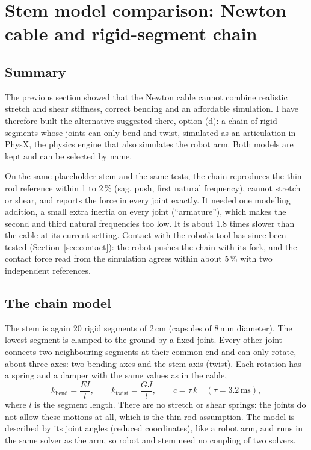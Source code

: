 \documentclass[11pt,a4paper]{article}
\begin{document}
\section{Stem model comparison: Newton cable and rigid-segment chain}

\subsection{Summary}

The previous section showed that the Newton cable cannot combine realistic stretch and shear stiffness,
correct bending and an affordable simulation. I have therefore built the alternative suggested there, option
(d): a chain of rigid segments whose joints can only bend and twist, simulated as an articulation in PhysX,
the physics engine that also simulates the robot arm. Both models are kept and can be selected by name.

On the same placeholder stem and the same tests, the chain reproduces the thin-rod reference within 1 to
2\,\% (sag, push, first natural frequency), cannot stretch or shear, and reports the force in every joint
exactly. It needed one modelling addition, a small extra inertia on every joint (``armature''), which makes the
second and third natural frequencies too low. It is about 1.8 times slower than the cable at its current
setting. Contact with the robot's tool has since been tested (Section~\ref{sec:contact}): the robot pushes the
chain with its fork, and the contact force read from the simulation agrees within about 5\,\% with two
independent references.

\subsection{The chain model}

The stem is again 20 rigid segments of 2\,cm (capsules of 8\,mm diameter). The lowest segment is clamped to
the ground by a fixed joint. Every other joint connects two neighbouring segments at their common end and can
only rotate, about three axes: two bending axes and the stem axis (twist). Each rotation has a spring and a
damper with the same values as in the cable,
\begin{equation*}
  k_\text{bend} = \frac{EI}{l}, \qquad k_\text{twist} = \frac{GJ}{l}, \qquad
  c = \tau\, k \quad (\tau = 3.2\,\text{ms}),
\end{equation*}
where $l$ is the segment length. There are no stretch or shear springs: the joints do not allow these motions
at all, which is the thin-rod assumption. The model is described by its joint angles (reduced coordinates),
like a robot arm, and runs in the same solver as the arm, so robot and stem need no coupling of two solvers.
\end{document}
